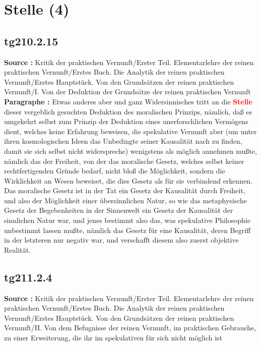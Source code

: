 \documentclass[a4paper,12pt,twoside]{book}
\newcommand{\match}[1]{\textcolor{red}{\textbf{#1}}}
\newcommand{\unnumberedsection}[1]{
	\section*{#1}
	\addcontentsline{toc}{section}{#1}
	\markright{#1}
}
\begin{document}
	\unnumberedsection{Stelle (4)} 
	\subsection*{tg210.2.15} 
	\textbf{Source : }Kritik der praktischen Vernunft/Erster Teil. Elementarlehre der reinen praktischen Vernunft/Erstes Buch. Die Analytik der reinen praktischen Vernunft/Erstes Hauptstück. Von den Grundsätzen der reinen praktischen Vernunft/I. Von der Deduktion der Grundsätze der reinen praktischen Vernunft\\  
	
	\noindent\textbf{Paragraphe : }Etwas anderes aber und ganz Widersinnisches tritt an die \match{Stelle} dieser vergeblich gesuchten Deduktion des moralischen  Prinzips, nämlich, daß es umgekehrt selbst zum Prinzip der Deduktion eines unerforschlichen Vermögens dient, welches keine Erfahrung beweisen, die spekulative Vernunft aber (um unter ihren kosmologischen Ideen das Unbedingte seiner Kausalität nach zu finden, damit sie sich selbst nicht widerspreche) wenigstens als möglich annehmen mußte, nämlich das der Freiheit, von der das moralische Gesetz, welches selbst keiner rechtfertigenden Gründe bedarf, nicht bloß die Möglichkeit, sondern die Wirklichkeit an Wesen beweiset, die dies Gesetz als für sie verbindend erkennen. Das moralische Gesetz ist in der Tat ein Gesetz der Kausalität durch Freiheit, und also der Möglichkeit einer übersinnlichen Natur, so wie das metaphysische Gesetz der Begebenheiten in der Sinnenwelt ein Gesetz der Kausalität der sinnlichen Natur war, und jenes bestimmt also das, was spekulative Philosophie unbestimmt lassen mußte, nämlich das Gesetz für eine Kausalität, deren Begriff in der letzteren nur negativ war, und verschafft diesem also zuerst objektive Realität. 
	
	\subsection*{tg211.2.4} 
	\textbf{Source : }Kritik der praktischen Vernunft/Erster Teil. Elementarlehre der reinen praktischen Vernunft/Erstes Buch. Die Analytik der reinen praktischen Vernunft/Erstes Hauptstück. Von den Grundsätzen der reinen praktischen Vernunft/II. Von dem Befugnisse der reinen Vernunft, im praktischen Gebrauche, zu einer Erweiterung, die ihr im spekulativen für sich nicht möglich ist\\  
	
\end{document}
